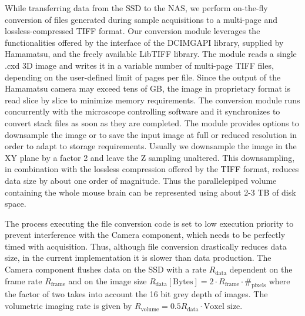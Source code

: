 \documentclass[12pt]{spieman}  %
\begin{document}

While transferring data from the SSD to the NAS, we perform on-the-fly conversion of files generated during sample acquisitions to a multi-page and lossless-compressed TIFF format. %
Our conversion module leverages the functionalities offered by the interface of the DCIMGAPI library, supplied by Hamamatsu, and the freely available LibTIFF library. The module reads a single .cxd 3D image and writes it in a variable number of multi-page TIFF files, depending on the user-defined limit of pages per file. Since the output of the Hamamatsu camera may exceed tens of GB, the image in proprietary format is read slice by slice to minimize memory requirements. The conversion module runs concurrently with the microscope controlling software and it synchronizes to convert stack files as soon as they are completed. The module provides options to downsample the image or to save the input image at full or reduced resolution in order to adapt to storage requirements. Usually we downsample the image in the XY plane by a factor 2 and leave the Z sampling unaltered. This downsampling, in combination with the lossless compression offered by the TIFF format, reduces data size by about one order of magnitude. Thus the parallelepiped volume containing the whole mouse brain can be represented using about 2-3 TB of disk space. 

The process executing the file conversion code is set to low execution priority to prevent interference with the Camera component, which needs to be perfectly timed with acquisition. Thus, although file conversion drastically reduces data size, in the current implementation it is slower than data production. The Camera component flushes data on the SSD with a rate $R_{\text{data}}$ dependent on the frame rate $R_{\text{frame}}$ and on the image size $R_{\text{data}} [\text{Bytes}] = 2\cdot R_{\text{frame}} \cdot \#_{\text{pixels}}$
where the factor of two takes into account the 16 bit grey depth of images. The volumetric imaging rate is given by $R_{\text{volume}} = 0.5 R_{\text{data}} \cdot \text{Voxel size}$.
\end{document}
